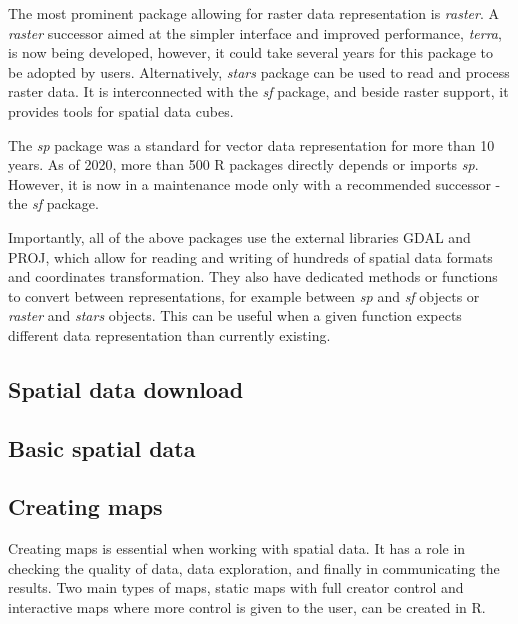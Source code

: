 \documentclass[smallextended]{svjour3}       %
\begin{document}
The most prominent package allowing for raster data representation is \emph{raster}.
A \emph{raster} successor aimed at the simpler interface and improved performance, \emph{terra}, is now being developed, however, it could take several years for this package to be adopted by users.
Alternatively, \emph{stars} package can be used to read and process raster data.
It is interconnected with the \emph{sf} package, and beside raster support, it provides tools for spatial data cubes.

The \emph{sp} package was a standard for vector data representation for more than 10 years.
As of 2020, more than 500 R packages directly depends or imports \emph{sp}.
However, it is now in a maintenance mode only with a recommended successor - the \emph{sf} package.

Importantly, all of the above packages use the external libraries GDAL and PROJ, which allow for reading and writing of hundreds of spatial data formats and coordinates transformation.
They also have dedicated methods or functions to convert between representations, for example between \emph{sp} and \emph{sf} objects or \emph{raster} and \emph{stars} objects.
This can be useful when a given function expects different data representation than currently existing.

\hypertarget{spatial-data-download}{%
\subsection{Spatial data download}\label{spatial-data-download}}

\hypertarget{basic-spatial-data}{%
\subsection{Basic spatial data}\label{basic-spatial-data}}

\hypertarget{creating-maps}{%
\subsection{Creating maps}\label{creating-maps}}

Creating maps is essential when working with spatial data.
It has a role in checking the quality of data, data exploration, and finally in communicating the results.
Two main types of maps, static maps with full creator control and interactive maps where more control is given to the user, can be created in R.
\end{document}
